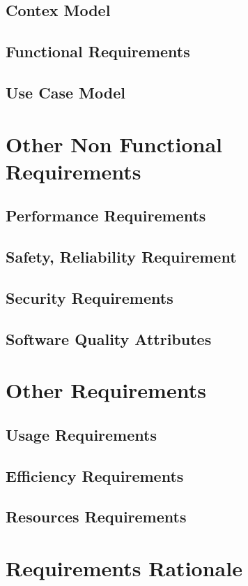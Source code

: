 \documentclass{report}
\begin{document}
		\section{Contex Model}
		\section{Functional Requirements}
		\section{Use Case Model}
	\chapter{Other Non Functional Requirements}
		\section{Performance Requirements}
		\section{Safety, Reliability Requirement}
		\section{Security Requirements}
		\section{Software Quality Attributes}
	\chapter{Other Requirements}
		\section{Usage Requirements}
		\section{Efficiency Requirements}
		\section{Resources Requirements}
	\chapter{Requirements Rationale}
\end{document}
